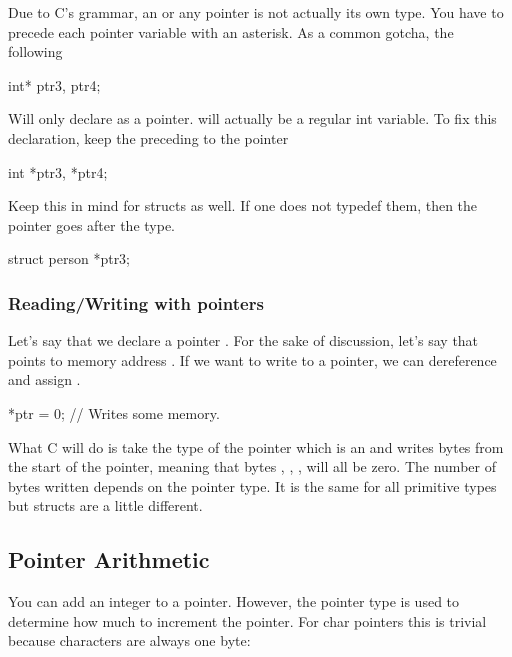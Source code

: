Due to C's grammar, an  or any pointer is not actually its
own type. You have to precede each pointer variable with an asterisk. As
a common gotcha, the following

\begin{code}[language=C]
int* ptr3, ptr4;
\end{code}

Will only declare  as a pointer.  will
actually be a regular int variable. To fix this declaration, keep the
\keyword{*} preceding to the pointer

\begin{code}[language=C]
int *ptr3, *ptr4;
\end{code}

Keep this in mind for structs as well. If one does not typedef them, then the pointer goes after the type.

\begin{code}[language=C]
struct person *ptr3;
\end{code}

\subsubsection{Reading/Writing with pointers}

Let's say that we declare a pointer . For the sake of
discussion, let's say that  points to memory address
. If we want to write to a pointer, we can dereference
and assign .

\begin{code}[language=C]
*ptr = 0; // Writes some memory.
\end{code}

What C will do is take the type of the pointer which is an 
and writes  bytes from the start of the pointer,
meaning that bytes , , ,
 will all be zero. The number of bytes written depends on
the pointer type. It is the same for all primitive types but structs are
a little different.

\subsection{Pointer Arithmetic}

You can add an integer to a pointer. However, the pointer type is used
to determine how much to increment the pointer. For char pointers this
is trivial because characters are always one byte:

